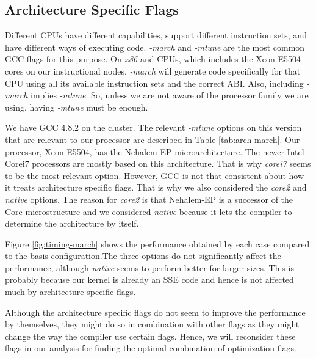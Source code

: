 \documentclass{article}
\begin{document}
\subsection{Architecture Specific Flags}

Different CPUs have different capabilities, support different instruction sets, and have different ways of executing code. \textit{-march} and \textit{-mtune} are the most common GCC flags for this purpose. On \textit{x86} and  CPUs, which includes the Xeon E5504 cores on our instructional nodes, \textit{-march} will generate code specifically for that CPU using all its available instruction sets and the correct ABI. Also, including \textit{-march} implies \textit{-mtune}. So, unless we are not aware of the processor family we are using, having \textit{-mtune} must be enough. 

We have GCC 4.8.2 on the cluster. The relevant \textit{-mtune} options on this version that are relevant to our processor are described in Table \ref{tab:arch-march}. Our processor, Xeon E5504, has the Nehalem-EP microarchitecture. The newer Intel Corei7 processors are mostly based on this architecture. That is why \textit{corei7} seems to be the most relevant option. However, GCC is not that consistent about how it treats architecture specific flags. That is why we also considered the \textit{core2} and \textit{native} options. The reason for \textit{core2} is that Nehalem-EP is a successor of the Core microstructure and we considered \textit{native} because it lets the compiler to determine the architecture by itself. 

Figure \ref{fig:timing-march} shows the performance obtained by each case compared to the basis configuration.The three options do not significantly affect the performance, although \textit{native} seems to perform better for larger sizes. This is probably because our kernel is already an SSE code and hence is not affected much by architecture specific flags. 

Although the architecture specific flags do not seem to improve the performance by themselves, they might do so in combination with other flags as they might change the way the compiler use certain flags. Hence, we will reconsider these flags in our analysis for finding the optimal combination of optimization flags.
\end{document}
